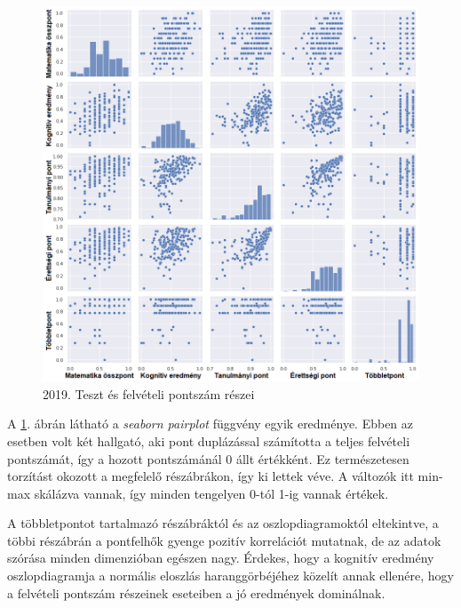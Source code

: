 \documentclass[12pt]{article}
\begin{document}
\begin{figure}[H]
\centering
\includegraphics[width=\textwidth]{kepek/2019minmax3.png}
\caption{2019. Teszt és felvételi pontszám részei}
\label{fig:2019minmax3}
\end{figure}

A \ref{fig:2019minmax3}. ábrán látható a \textit{seaborn pairplot} függvény egyik eredménye. Ebben az esetben volt két hallgató, aki pont duplázással számította a teljes felvételi pontszámát, így a hozott pontszámánál 0 állt értékként. Ez természetesen torzítást okozott a megfelelő részábrákon, így ki lettek véve. A változók itt min-max skálázva vannak, így minden tengelyen 0-tól 1-ig vannak értékek.

A többletpontot tartalmazó részábráktól és az oszlopdiagramoktól eltekintve, a többi részábrán a pontfelhők gyenge pozitív korrelációt mutatnak, de az adatok szórása minden dimenzióban egészen nagy. Érdekes, hogy a kognitív eredmény oszlopdiagramja a normális eloszlás haranggörbéjéhez közelít annak ellenére, hogy a felvételi pontszám részeinek eseteiben a jó eredmények dominálnak.
\end{document}
